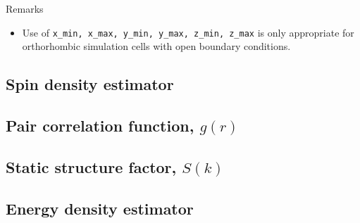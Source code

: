 Remarks
\begin{itemize}
  \item{Use of \texttt{x\_min, x\_max, y\_min, y\_max, z\_min, z\_max} is only appropriate for orthorhombic simulation cells with open boundary conditions.}
\end{itemize}




\subsection{Spin density estimator}

%   


\subsection{Pair correlation function, $g(r)$}


\subsection{Static structure factor, $S(k)$}



\subsection{Energy density estimator}

